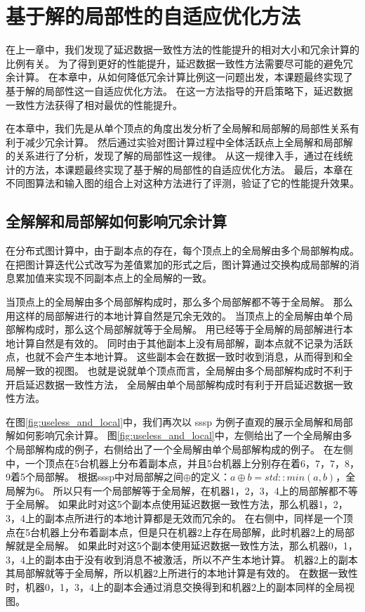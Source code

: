 \chapter{基于解的局部性的自适应优化方法}
在上一章中，我们发现了延迟数据一致性方法的性能提升的相对大小和冗余计算的比例有关。
为了得到更好的性能提升，延迟数据一致性方法需要尽可能的避免冗余计算。
在本章中，从如何降低冗余计算比例这一问题出发，本课题最终实现了基于解的局部性这一自适应优化方法。
在这一方法指导的开启策略下，延迟数据一致性方法获得了相对最优的性能提升。

在本章中，我们先是从单个顶点的角度出发分析了全局解和局部解的局部性关系有利于减少冗余计算。
然后通过实验对图计算过程中全体活跃点上全局解和局部解的关系进行了分析，发现了解的局部性这一规律。
从这一规律入手，通过在线统计的方法，本课题最终实现了基于解的局部性的自适应优化方法。
最后，本章在不同图算法和输入图的组合上对这种方法进行了评测，验证了它的性能提升效果。

\section{全解解和局部解如何影响冗余计算}

在分布式图计算中，由于副本点的存在，每个顶点上的全局解由多个局部解构成。
在把图计算迭代公式改写为差值累加的形式之后，图计算通过交换构成局部解的消息累加值来实现不同副本点上的全局解的一致。

当顶点上的全局解由多个局部解构成时，那么多个局部解都不等于全局解。
那么用这样的局部解进行的本地计算自然是冗余无效的。
当顶点上的全局解由单个局部解构成时，那么这个局部解就等于全局解。
用已经等于全局解的局部解进行本地计算自然是有效的。
同时由于其他副本上没有局部解，副本点就不记录为活跃点，也就不会产生本地计算。
这些副本会在数据一致时收到消息，从而得到和全局解一致的视图。
也就是说就单个顶点而言，全局解由多个局部解构成时不利于开启延迟数据一致性方法，
全局解由单个局部解构成时有利于开启延迟数据一致性方法。


在图\ref{fig:useless_and_local}中，我们再次以 sssp 为例子直观的展示全局解和局部解如何影响冗余计算。
图\ref{fig:useless_and_local}中，左侧给出了一个全局解由多个局部解构成的例子，右侧给出了一个全局解由单个局部解构成的例子。
在左侧中，一个顶点在5台机器上分布着副本点，并且5台机器上分别存在着6，7，7，8，9着5个局部解。
根据sssp中对局部解之间$\oplus$的定义：$a\oplus b=std::min(a,b)$，全局解为6。
所以只有一个局部解等于全局解，在机器1，2，3，4上的局部解都不等于全局解。
如果此时对这5个副本点使用延迟数据一致性方法，那么机器1，2，3，4上的副本点所进行的本地计算都是无效而冗余的。
在右侧中，同样是一个顶点在5台机器上分布着副本点，但是只在机器2上存在局部解，此时机器2上的局部解就是全局解。
如果此时对这5个副本使用延迟数据一致性方法，那么机器0，1，3，4上的副本由于没有收到消息不被激活，所以不产生本地计算。
机器2上的副本其局部解就等于全局解，所以机器2上所进行的本地计算是有效的。
在数据一致性时，机器0，1，3，4上的副本会通过消息交换得到和机器2上的副本同样的全局视图。



